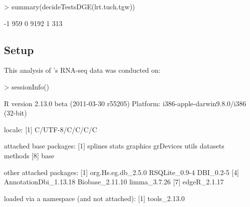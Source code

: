 \begin{Schunk}
\begin{Sinput}
> summary(decideTestsDGE(lrt.tuch.tgw))
\end{Sinput}
\begin{Soutput}
   [,1]
-1  959
0  9192
1   313
\end{Soutput}
\end{Schunk}


\subsection{Setup}
This analysis of \citet{Tuch:2010p457}'s RNA-seq data was conducted on:
\begin{Schunk}
\begin{Sinput}
> sessionInfo()
\end{Sinput}
\begin{Soutput}
R version 2.13.0 beta (2011-03-30 r55205)
Platform: i386-apple-darwin9.8.0/i386 (32-bit)

locale:
[1] C/UTF-8/C/C/C/C

attached base packages:
[1] splines   stats     graphics  grDevices utils     datasets  methods  
[8] base     

other attached packages:
[1] org.Hs.eg.db_2.5.0    RSQLite_0.9-4         DBI_0.2-5            
[4] AnnotationDbi_1.13.18 Biobase_2.11.10       limma_3.7.26         
[7] edgeR_2.1.17         

loaded via a namespace (and not attached):
[1] tools_2.13.0
\end{Soutput}
\end{Schunk}


